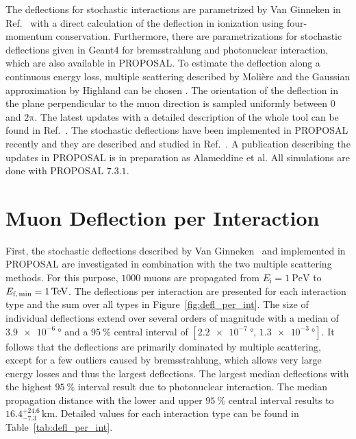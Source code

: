 The deflections for stochastic interactions are parametrized by Van Ginneken 
in Ref.~\cite{Van_Ginneken} with a direct calculation of the deflection in 
ionization using four-momentum conservation. 
Furthermore, there are parametrizations for stochastic deflections given in Geant4 \cite{GEANT4} 
for bremsstrahlung and photonuclear interaction, which 
are also available in PROPOSAL.
To estimate the deflection along 
a continuous energy loss, multiple scattering described by Molière 
\cite{moliere_scattering} and the Gaussian approximation by Highland 
can be chosen \cite{HIGHLAND_1975}. 
The orientation of the deflection in the plane perpendicular to the muon direction is 
sampled uniformly between $0$ and $2\mathrm{\pi}$.
The latest updates with a detailed description of the whole tool can be found 
in Ref.~\cite{phd_soedingrekso}. 
The stochastic deflections have been implemented in PROPOSAL recently and they are 
described and studied in Ref.~\cite{Gutjahr_2021}.
A publication describing the 
updates in PROPOSAL is in preparation as Alameddine et al.
All simulations are done with PROPOSAL $7.3.1$.

\section{Muon Deflection per Interaction}\label{sec:defl_per_int}
First, the stochastic deflections described by Van Ginneken~\cite{Van_Ginneken} 
and implemented 
in PROPOSAL are investigated in combination with the two multiple scattering methods. 
For this purpose, $\num{1000}$ muons are propagated from $E_{\text{i}} = \SI{1}{\peta\electronvolt}$ to $E_{\text{f,\,min}} = \SI{1}{\tera\electronvolt}$.
The deflections per interaction are presented 
for each interaction type and the sum over all types in Figure~\ref{fig:defl_per_int}. 
The size of individual deflections 
extend over several orders of magnitude with a median of $\SI{3.9e-6}{\degree}$
and a $\SI{95}{\percent}$ central interval of $[\SI{2.2e-7}{\degree}, \,\SI{1.3e-3}{\degree}]$. 
It follows that the deflections are primarily dominated by multiple scattering, except for a few outliers caused by bremsstrahlung, which 
allows very large energy losses and thus the largest deflections. 
The largest median deflections with the highest $\SI{95}{\percent}$ interval result due to photonuclear interaction.
The median propagation distance with the lower and upper $\SI{95}{\percent}$ 
central interval results to $16.4_{-7.3}^{+24.6}\,\si{\kilo\meter}$.
Detailed values for each interaction type can be found in Table~\ref{tab:defl_per_int}.

